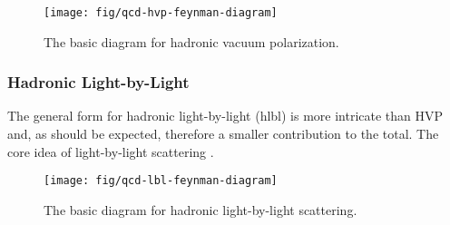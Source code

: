 \begin{figure}
\label{fig:qcd-hvp-feynman-diagram}
\texttt{[image: fig/qcd-hvp-feynman-diagram]}
\caption{The basic diagram for hadronic vacuum polarization.}
\end{figure}


\subsubsection{Hadronic Light-by-Light}

The general form for hadronic light-by-light (hlbl) is more intricate than HVP and, as should be expected, therefore a smaller contribution to the total.  The core idea of light-by-light scattering .

\begin{figure}
\label{fig:qcd-lbl-feynman-diagram}
\texttt{[image: fig/qcd-lbl-feynman-diagram]}
\caption{The basic diagram for hadronic light-by-light scattering.}
\end{figure}


